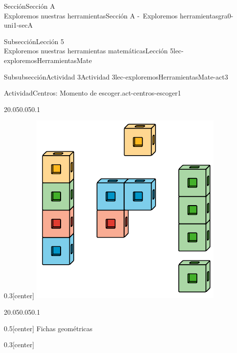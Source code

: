 \begin{sectionptx}{Sección}{{\Large Sección A\\}Exploremos nuestras herramientas}{}{Sección A -~Exploremos herramientas}{}{}{gra0-uni1-secA}
\begin{subsectionptx}{Subsección}{{\normalsize Lección 5\\[-0.05cm]}Exploremos nuestras herramientas matemáticas}{}{Lección 5}{}{}{lec-exploremosHerramientasMate}
\begin{subsubsectionptx}{Subsubsección}{Actividad 3}{}{Actividad 3}{}{}{lec-exploremosHerramientasMate-act3}
\begin{activity}{Actividad}{Centros: Momento de escoger.}{act-centros-escoger1}
\begin{sidebyside}{2}{0.05}{0.05}{0.1}
\begin{sbspanel}{0.3}[center]
\includegraphics[max width=\linewidth, center]{external/svg-source/tikz-file-128850.pdf}
\end{sbspanel}%
\end{sidebyside}%
\begin{sidebyside}{2}{0.05}{0.05}{0.1}%
\begin{sbspanel}{0.5}[center]%
Fichas geométricas%
\end{sbspanel}%
\begin{sbspanel}{0.3}[center]%

\end{sbspanel}
\end{sidebyside}
\end{activity}
\end{subsubsectionptx}
\end{subsectionptx}
\end{sectionptx}
